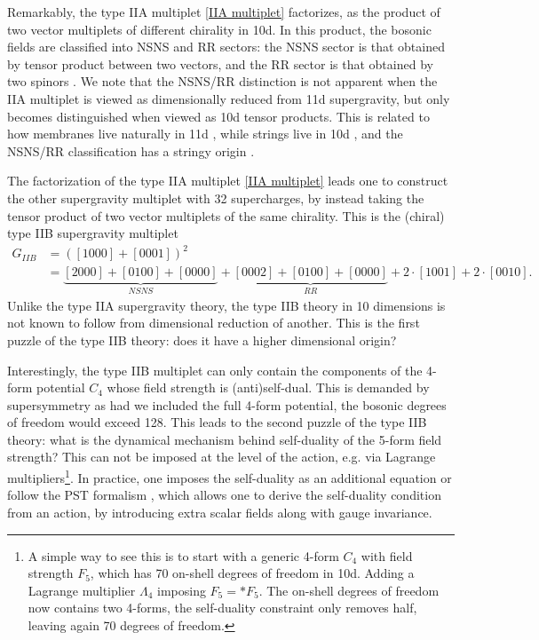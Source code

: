 Remarkably, the type IIA multiplet \eqref{IIA multiplet} factorizes, as the product of two vector multiplets of different chirality in 10d.
In this product, the bosonic fields are classified into NSNS and RR sectors: the NSNS sector is that obtained by tensor product between two vectors, and the RR sector is that obtained by two spinors \cite{Polchinski:1998rr}.
We note that the NSNS/RR distinction is not apparent when the IIA multiplet is viewed as dimensionally reduced from 11d supergravity, but only becomes distinguished when viewed as 10d tensor products.
This is related to how membranes live naturally in 11d \cite{Bergshoeff:1987cm}, while strings live in 10d \cite{Green:2012oqa}, and the NSNS/RR classification has a stringy origin \cite{Polchinski:1995mt}.

The factorization of the type IIA multiplet \eqref{IIA multiplet} leads one to construct the other supergravity multiplet with 32 supercharges, by instead taking the tensor product of two vector multiplets of the same chirality. This is the (chiral) type IIB supergravity multiplet
\begin{equation}
\begin{aligned}
G_{IIB}
&=\left([1000] + [0001]\right)^2\\
&=\underbrace{[2000]+[0100] + [0000]}_{NSNS} 
+ \underbrace{[0002] + [0100] + [0000]}_{RR} + 2\cdot[1001] + 2\cdot[0010].
\end{aligned}
\end{equation}
Unlike the type IIA supergravity theory, the type IIB theory in 10 dimensions is not known to follow from dimensional reduction of another.
This is the first puzzle of the type IIB theory: does it have a higher dimensional origin?

{\color{orange}
Interestingly, the type IIB multiplet can only contain the components of the 4-form potential $C_4$ whose field strength is (anti)self-dual. 
This is demanded by supersymmetry as had we included the full 4-form potential, the bosonic degrees of freedom would exceed 128.}
This leads to the second puzzle of the type IIB theory: 
what is the dynamical mechanism behind self-duality of the 5-form field strength?
This can not be imposed at the level of the action, e.g. via Lagrange multipliers\footnote{
A simple way to see this is to start with a generic 4-form $C_4$ with field strength $F_5$, which has 70 on-shell degrees of freedom in 10d.
Adding a Lagrange multiplier $\Lambda_4$ imposing $F_5 = * F_5$.
The on-shell degrees of freedom now contains two 4-forms, the self-duality constraint only removes half, leaving again 70 degrees of freedom.
}. 
In practice, one imposes the self-duality as an additional equation or follow the PST formalism \cite{Pasti:1996vs, DallAgata:1997gnw, DallAgata:1998ahf}, which allows one to derive the self-duality condition from an action, by introducing extra scalar fields along with gauge invariance.

